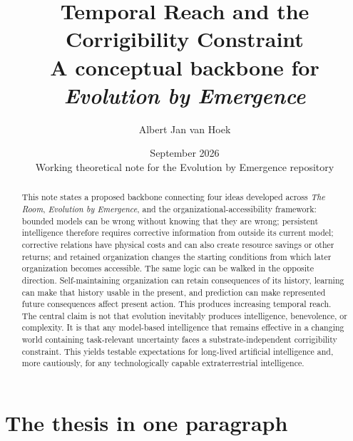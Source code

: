 \documentclass[11pt,a4paper]{article}
\title{\textbf{Temporal Reach and the Corrigibility Constraint}\\
\large A conceptual backbone for \emph{Evolution by Emergence}}
\author{Albert Jan van Hoek}
\date{September 2026\\\small Working theoretical note for the Evolution by Emergence repository}
\begin{document}
\maketitle

\begin{abstract}
This note states a proposed backbone connecting four ideas developed across \emph{The Room}, \emph{Evolution by Emergence}, and the organizational-accessibility framework: bounded models can be wrong without knowing that they are wrong; persistent intelligence therefore requires corrective information from outside its current model; corrective relations have physical costs and can also create resource savings or other returns; and retained organization changes the starting conditions from which later organization becomes accessible. The same logic can be walked in the opposite direction. Self-maintaining organization can retain consequences of its history, learning can make that history usable in the present, and prediction can make represented future consequences affect present action. This produces increasing temporal reach. The central claim is not that evolution inevitably produces intelligence, benevolence, or complexity. It is that any model-based intelligence that remains effective in a changing world containing task-relevant uncertainty faces a substrate-independent corrigibility constraint. This yields testable expectations for long-lived artificial intelligence and, more cautiously, for any technologically capable extraterrestrial intelligence.
\end{abstract}

\section{The thesis in one paragraph}
\end{document}
